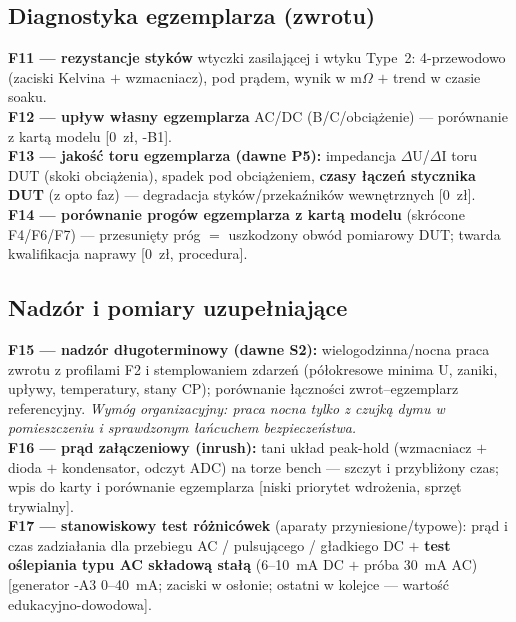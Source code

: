 \documentclass[11pt,a4paper]{article}
\newcommand{\ohm}{$\Omega$}
\begin{document}
\subsection{Diagnostyka egzemplarza (zwrotu)}
\textbf{F11 --- rezystancje styków} wtyczki zasilającej i wtyku Type~2: 4-przewodowo (zaciski
Kelvina $+$ wzmacniacz), pod prądem, wynik w m\ohm{} $+$ trend w czasie soaku.\\
\textbf{F12 --- upływ własny egzemplarza} AC/DC (B/C/obciążenie) --- porównanie z kartą modelu
[0~zł, -B1].\\
\textbf{F13 --- jakość toru egzemplarza (dawne P5):} impedancja $\Delta$U/$\Delta$I toru DUT
(skoki obciążenia), spadek pod obciążeniem, \textbf{czasy łączeń stycznika DUT} (z opto faz)
--- degradacja styków/przekaźników wewnętrznych [0~zł].\\
\textbf{F14 --- porównanie progów egzemplarza z kartą modelu} (skrócone F4/F6/F7) --- przesunięty
próg $=$ uszkodzony obwód pomiarowy DUT; twarda kwalifikacja naprawy [0~zł, procedura].

\subsection{Nadzór i pomiary uzupełniające}
\textbf{F15 --- nadzór długoterminowy (dawne S2):} wielogodzinna/nocna praca zwrotu z profilami
F2 i stemplowaniem zdarzeń (półokresowe minima U, zaniki, upływy, temperatury, stany CP);
porównanie łączności zwrot--egzemplarz referencyjny. \emph{Wymóg organizacyjny: praca nocna tylko
z czujką dymu w pomieszczeniu i sprawdzonym łańcuchem bezpieczeństwa.}\\
\textbf{F16 --- prąd załączeniowy (inrush):} tani układ peak-hold (wzmacniacz $+$ dioda $+$
kondensator, odczyt ADC) na torze bench --- szczyt i przybliżony czas; wpis do karty i porównanie
egzemplarza [niski priorytet wdrożenia, sprzęt trywialny].\\
\textbf{F17 --- stanowiskowy test różnicówek} (aparaty przyniesione/typowe): prąd i czas
zadziałania dla przebiegu AC / pulsującego / gładkiego DC $+$ \textbf{test oślepiania typu AC
składową stałą} (6--10~mA DC $+$ próba 30~mA AC) [generator -A3 0--40~mA; zaciski w osłonie;
ostatni w kolejce --- wartość edukacyjno-dowodowa].
\end{document}
